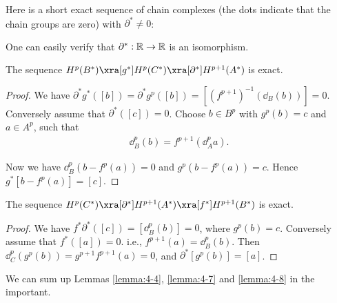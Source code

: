 \begin{example}\label{exampl:4-6}
  Here is a short exact sequence of chain complexes (the dots indicate
  that the chain groups are zero) with $\partial^*\neq 0$:

\begin{center}
\end{center}

One can easily verify that $\partial^*:\mathbb{R}\to\mathbb{R}$ is an isomorphism.
\end{example}


\begin{lemma}\label{lemma:4-7}
  The sequence $H^p(B^*)\xra[g^*] H^p(C^*)\xra[\partial^*]H^{p+1}(A^*)$ is exact.
\end{lemma}

\begin{proof}
  We have $\partial^*g^*([b]) = \partial^*g^p([b]) = [(f^{p+1})^{-1} (\dd_B(b))] = 0$. Conversely assume 
  that $\partial^*([c]) = 0$. Choose $b\in B^p$ with $g^p(b) = c$ and $a\in A^p$, such that 
  \begin{align*}
    \dd^p_B(b) = f^{p+1}(\dd^p_Aa).
  \end{align*}

  Now we have $\dd^p_B(b - f^p(a)) = 0$ and $g^p(b-f^p(a)) = c$. Hence $g^*[b-f^p(a)] = [c]$.
\end{proof}


\begin{lemma}\label{lemma:4-8}
  The sequence $H^p(C^*)\xra[\partial^*] H^{p+1}(A^*)\xra[f^*] H^{p+1}(B^*)$ is exact.
\end{lemma}

\begin{proof}
  We have $f^*\partial^*([c]) = [\dd^p_B(b)] = 0$, where $g^p(b) = c$. Conversely assume that $f^*([a]) = 0$.
i.e., $f^{p+1}(a) = \dd^p_B(b)$. Then $\dd^p_C(g^p(b)) = g^{p+1}f^{p+1}(a) = 0$, and $\partial^*[g^p(b)] = [a]$.
\end{proof}

We can sum up Lemmas \ref{lemma:4-4}, \ref{lemma:4-7} and \ref{lemma:4-8} in the important.


